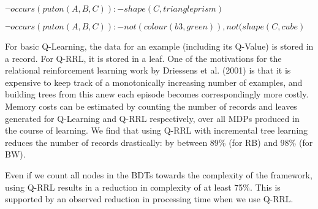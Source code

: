 $\neg occurs(puton(A,B,C)) :- shape(C,triangleprism)$

$\neg occurs(puton(A,B,C)) :- not(colour(b3,green)), not(shape(C,cube)$




For basic Q-Learning, the data for an example (including its Q-Value) is stored 
in a record. For Q-RRL, it is stored in a leaf. 
One of the motivations for the relational reinforcement learning work by 
Driessens et al. (2001) is that it is expensive to keep track of a monotonically 
increasing number of examples, and building trees from this anew each episode 
becomes correspondingly more costly.  
Memory costs can be estimated by counting the number of records and leaves 
generated for Q-Learning and Q-RRL respectively, over all MDPs produced in the 
course of learning. 
We find that using Q-RRL with incremental tree learning reduces the number of 
records drastically: by between 89\% (for RB) and 98\% (for BW). 

Even if we count all nodes in the BDTs towards the complexity of the framework, 
using Q-RRL results in a reduction in complexity of at least 75\%.
This is supported by an observed reduction in processing time when we use Q-RRL.



